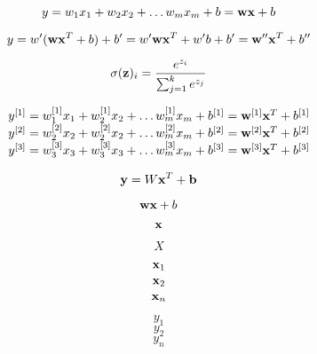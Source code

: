 \documentclass[11pt]{article}
\begin{document}
\[
y = w_1 x_1 + w_2 x_2 + \ldots w_m x_m + b = {\bf w}  {\bf x} + b\\
\]

\[
y = w'  ({\bf w}  {\bf x}^T + b) + b' = w'  {\bf w}  {\bf x}^T + w'b + b' = {\bf w}'' {\bf x}^T + b''
\]

\[
\sigma({\bf z})_i = \frac{e^{z_i}}{\sum_{j=1}^k e^{z_j}}
\]

\[
\begin{array}{l}
y^{[1]} = w_1^{[1]} x_1 + w_2^{[1]} x_2 + \ldots w_m^{[1]} x_m + b^{[1]} = {\bf w}^{[1]} {\bf x}^T + b^{[1]}\\
y^{[2]} = w_2^{[2]} x_2 + w_2^{[2]} x_2 + \ldots w_m^{[2]} x_m + b^{[2]} = {\bf w}^{[2]} {\bf x}^T + b^{[2]}\\
y^{[3]} = w_3^{[3]} x_3 + w_3^{[3]} x_3 + \ldots w_m^{[3]} x_m + b^{[3]} = {\bf w}^{[3]} {\bf x}^T + b^{[3]}\\
\end{array}
\]

\[
{\bf y} = W {\bf x}^T + {\bf b}
\]

\[
{\bf w} {\bf x} + b
\]

\[
{\bf x}
\]

\[
X
\]

\[
{\bf x}_1
\]
\[
{\bf x}_2
\]
\[
{\bf x}_n
\]

\[
y_1
\]
\[
y_2
\]
\[
y_n
\]


 
\end{document}
